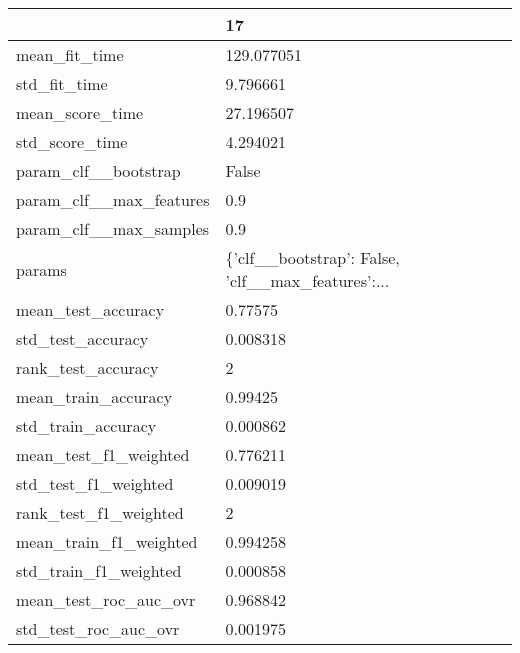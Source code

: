 \begin{tabular}{ll}
\toprule
{} &                                                 17 \\
\midrule
mean\_fit\_time               &                                         129.077051 \\
std\_fit\_time                &                                           9.796661 \\
mean\_score\_time             &                                          27.196507 \\
std\_score\_time              &                                           4.294021 \\
param\_clf\_\_bootstrap        &                                              False \\
param\_clf\_\_max\_features     &                                                0.9 \\
param\_clf\_\_max\_samples      &                                                0.9 \\
params                      &  \{'clf\_\_bootstrap': False, 'clf\_\_max\_features':... \\
mean\_test\_accuracy          &                                            0.77575 \\
std\_test\_accuracy           &                                           0.008318 \\
rank\_test\_accuracy          &                                                  2 \\
mean\_train\_accuracy         &                                            0.99425 \\
std\_train\_accuracy          &                                           0.000862 \\
mean\_test\_f1\_weighted       &                                           0.776211 \\
std\_test\_f1\_weighted        &                                           0.009019 \\
rank\_test\_f1\_weighted       &                                                  2 \\
mean\_train\_f1\_weighted      &                                           0.994258 \\
std\_train\_f1\_weighted       &                                           0.000858 \\
mean\_test\_roc\_auc\_ovr       &                                           0.968842 \\
std\_test\_roc\_auc\_ovr        &                                           0.001975 \\

\end{tabular}
